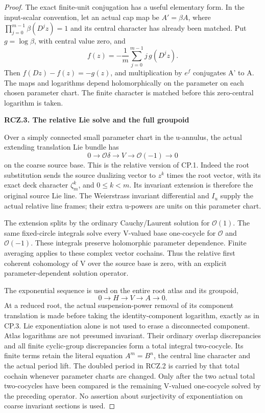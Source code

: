 \begin{proof}
The exact finite-unit conjugation has a useful elementary form.
In the input-scalar convention, let an actual cap map be
\(A'=\beta A\), where \(\prod_{j=0}^{m-1}\beta(D^jz)=1\)
and its central character has already been matched. Put
\(g=\log\beta\), with central value zero, and
\[
 f(z)=-\frac1m\sum_{j=0}^{m-1}j\,g(D^jz).
\]
Then \(f(Dz)-f(z)=-g(z)\), and multiplication by \(e^f\)
conjugates A' to A. The maps and logarithms depend holomorphically
on the parameter on each chosen parameter chart. The finite
character is matched before this zero-central logarithm is taken.

\par

\medskip\noindent\textbf{RCZ.3. The relative Lie solve and the full groupoid}

\par\nobreak

Over a simply connected small parameter chart in the u-annulus,
the actual extending translation Lie bundle has
\[
 0\longrightarrow\mathcal O\delta\longrightarrow V
       \longrightarrow\mathcal O(-1)\longrightarrow0
\]
on the coarse source base. This is the relative version of CP.1.
Indeed the root substitution sends the source dualizing vector
to \(z^k\) times the root vector, with its exact deck character
\(\zeta_m^k\), and \(0\le k<m\). Its invariant extension is
therefore the original source Lie line. The Weierstrass invariant
differential and \(I_u\) supply the actual relative line frames;
their extra u-powers are units on this parameter chart.

The extension splits by the ordinary Cauchy/Laurent solution for
\(\mathcal O(1)\). The same fixed-circle integrals solve every
V-valued base one-cocycle for \(\mathcal O\) and
\(\mathcal O(-1)\). These integrals preserve holomorphic
parameter dependence. Finite averaging applies to these complex
vector cochains. Thus the relative first coherent cohomology of
V over the source base is zero, with an explicit parameter-dependent
solution operator.

The exponential sequence is used on the entire root atlas and
its groupoid,
\[
 0\longrightarrow H\longrightarrow V\longrightarrow A
       \longrightarrow0.
\]
At a reduced root, the actual suspension-power removal of its
component translation is made before taking the identity-component
logarithm, exactly as in CP.3. Lie exponentiation alone is not used
to erase a disconnected component.
Atlas logarithms are not presumed invariant. Their ordinary
overlap discrepancies and all finite cyclic-group discrepancies
form a total integral two-cocycle. Its finite terms retain the
literal equation \(A^m=B^n\), the central line character and
the actual period lift. The doubled period in RCZ.2 is carried
by that total cochain whenever parameter charts are changed.
Only after the two actual total two-cocycles have been compared
is the remaining V-valued one-cocycle solved by the preceding
operator. No assertion about surjectivity of exponentiation on
coarse invariant sections is used.


\end{proof}
